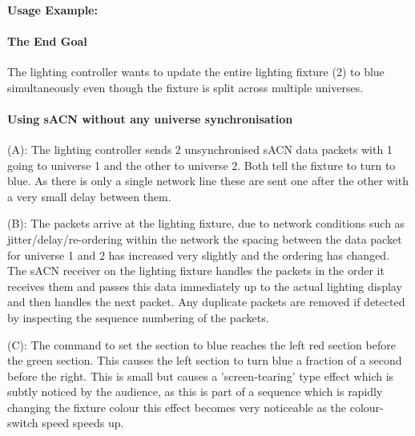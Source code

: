 \documentclass[11pt,a4paper]{article}
\begin{document}
\paragraph{Usage Example:}
\paragraph{The End Goal}
The lighting controller wants to update the entire lighting fixture (2) to blue simultaneously even though the fixture is split across multiple universes.
\paragraph{Using sACN without any universe synchronisation}
\begin{list}{}{}
	\item (A): The lighting controller sends 2 unsynchronised sACN data packets with 1 going to universe 1 and the other to universe 2. Both tell the fixture to turn to blue. As there is only a single network line these are sent one after the other with a very small delay between them.
	
	\item (B): The packets arrive at the lighting fixture, due to network conditions such as jitter/delay/re-ordering within the network the spacing between the data packet for universe 1 and 2 has increased very slightly and the ordering has changed. The sACN receiver on the lighting fixture handles the packets in the order it receives them and passes this data immediately up to the actual lighting display and then handles the next packet. Any duplicate packets are removed if detected by inspecting the sequence numbering of the packets.
	
	\item (C): The command to set the section to blue reaches the left red section before the green section. This causes the left section to turn blue a fraction of a second before the right. This is small but causes a 'screen-tearing' type effect which is subtly noticed by the audience, as this is part of a sequence which is rapidly changing the fixture colour this effect becomes very noticeable as the colour-switch speed speeds up.
\end{list}
\end{document}
